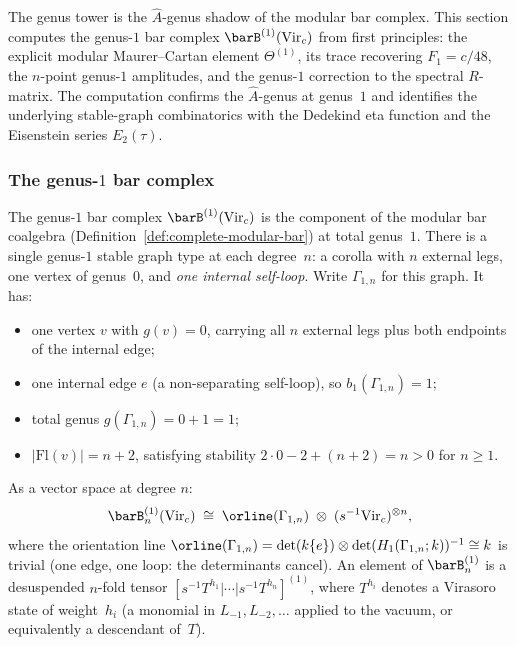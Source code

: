 The genus tower is the $\hat A$-genus shadow of the modular bar
complex. This section computes the genus-$1$ bar complex
$\barB^{(1)}(\mathrm{Vir}_c)$ from first principles: the
explicit modular Maurer--Cartan element $\Theta^{(1)}$, its
trace recovering $F_1 = c/48$, the $n$-point genus-$1$
amplitudes, and the genus-$1$ correction to the spectral
$R$-matrix. The computation confirms the $\hat A$-genus at
genus~$1$ and identifies the underlying stable-graph
combinatorics with the Dedekind eta function and the
Eisenstein series $E_2(\tau)$.

\subsubsection*{The genus-$1$ bar complex}

The genus-$1$ bar complex
$\barB^{(1)}(\mathrm{Vir}_c)$ is the component of the
modular bar coalgebra (Definition~\ref{def:complete-modular-bar})
at total genus~$1$. There is a single genus-$1$ stable graph
type at each degree~$n$: a corolla with $n$ external legs, one
vertex of genus~$0$, and \emph{one internal self-loop}.
Write $\Gamma_{1,n}$ for this graph. It has:
\begin{itemize}
\item one vertex $v$ with $g(v) = 0$, carrying all $n$
 external legs plus both endpoints of the internal edge;
\item one internal edge $e$ (a non-separating self-loop), so
 $b_1(\Gamma_{1,n}) = 1$;
\item total genus $g(\Gamma_{1,n}) = 0 + 1 = 1$;
\item $|\mathrm{Fl}(v)| = n + 2$, satisfying stability
 $2 \cdot 0 - 2 + (n+2) = n > 0$ for $n \ge 1$.
\end{itemize}

As a vector space at degree $n$:
\begin{equation}\label{eq:genus1-bar-degree}
\barB^{(1)}_n(\mathrm{Vir}_c)
\;\cong\;
\orline(\Gamma_{1,n})
\;\otimes\;
(s^{-1}\mathrm{Vir}_c)^{\otimes n},
\end{equation}
where the orientation line $\orline(\Gamma_{1,n})
= \det(k\{e\}) \otimes \det(H_1(\Gamma_{1,n};k))^{-1}
\cong k$ is trivial (one edge, one loop: the determinants cancel).
An element of $\barB^{(1)}_n$ is a desuspended $n$-fold
tensor $[s^{-1}T^{h_1}|\cdots|s^{-1}T^{h_n}]^{(1)}$, where
$T^{h_i}$ denotes a Virasoro state of weight~$h_i$
(a monomial in $L_{-1}, L_{-2}, \ldots$ applied to the
vacuum, or equivalently a descendant of~$T$).

